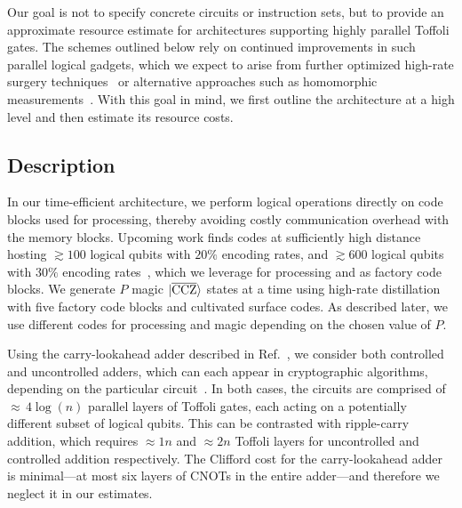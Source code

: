\documentclass[reprint,twocolumn,secnumarabic,amssymb, aps, prx]{revtex4-2}
\newcommand{\ccz}{\ket{\overline{\text{CCZ}}}}
\begin{document}
Our goal is not to specify concrete circuits or instruction sets, but to provide an approximate resource estimate for architectures supporting highly parallel Toffoli gates. The schemes outlined below rely on continued improvements in such parallel logical gadgets, which we expect to arise from further optimized high-rate surgery techniques~\cite{zheng2025high, cowtan2025fast, chang2026constant, zheng2026high} or alternative approaches such as homomorphic measurements~\cite{huang2022homomorphic, xu2025fast}. With this goal in mind, we first outline the architecture at a high level and then estimate its resource costs.

\subsection{Description}
In our time-efficient architecture, we perform logical operations directly on code blocks used for processing, thereby avoiding costly communication overhead with the memory blocks. Upcoming work finds codes at sufficiently high distance hosting $\gtrsim 100$ logical qubits with $20\%$ encoding rates, and $\gtrsim 600$ logical qubits with $30\%$ encoding rates~\cite{caltech2026codeatlas}, which we leverage for processing and as factory code blocks. We generate $P$ magic $\ccz$ states at a time using high-rate distillation with five factory code blocks and cultivated surface codes. As described later, we use different codes for processing and magic depending on the chosen value of $P$.

Using the carry-lookahead adder described in Ref.~\cite{draper2004logarithmic}, we consider both controlled and uncontrolled adders, which can each appear in cryptographic algorithms, depending on the particular circuit~\cite{gidney2019how, gidney2025how, chevignard2025reducing, proos2003shor, roetteler2017quantum, haner2020improved, litinski2023compute, gouzien2023performance}. In both cases, the circuits are comprised of $\approx$\,$4\log(n)$ parallel layers of Toffoli gates, each acting on a potentially different subset of logical qubits. This can be contrasted with ripple-carry addition, which requires $\approx1n$ and $\approx 2n$ Toffoli layers for uncontrolled and controlled addition respectively. The Clifford cost for the carry-lookahead adder is minimal---at most six layers of CNOTs in the entire adder---and therefore we neglect it in our estimates.
\end{document}
